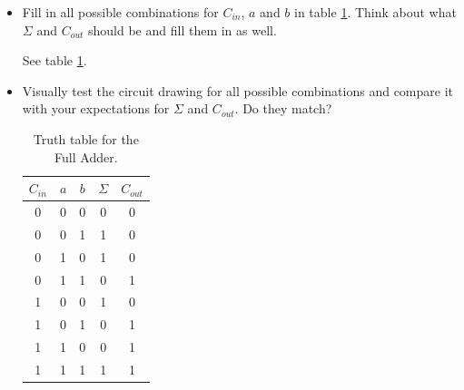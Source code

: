 \documentclass[10pt,a4paper]{article}
\begin{document}
	\begin{itemize}
		\item Fill in all possible combinations for $C_{in}$, $a$ and $b$ in table \ref{tab:full-adder-truth-table}. Think about what $\Sigma$ and $C_{out}$ should be and fill them in as well.
		\begin{center}
			See table \ref{tab:full-adder-truth-table}.
		\end{center}
		\item Visually test the circuit drawing for all possible combinations and compare it with your expectations for $\Sigma$ and $C_{out}$. Do they match?
		
		\begin{table}[H]
	\centering
	\begin{tabular}{|c|c|c||c|c|}
		\hline
		$C_{in}$ & $a$ & $b$ & $\Sigma$ & $C_{out}$ \\ \hline
		0&     0&     0&          0&           0\\ \hline
		0&     0&     1&          1&           0\\ \hline
		0&     1&     0&          1&           0\\ \hline
		0&     1&     1&          0&           1\\ \hline
		1&     0&     0&          1&           0\\ \hline
		1&     0&     1&          0&           1\\ \hline
		1&     1&     0&          0&           1\\ \hline
		1&     1&     1&          1&           1\\ \hline
	\end{tabular}
	\caption{Truth table for the Full Adder.}
	\label{tab:full-adder-truth-table}
\end{table}
		

\end{itemize}
\end{document}
